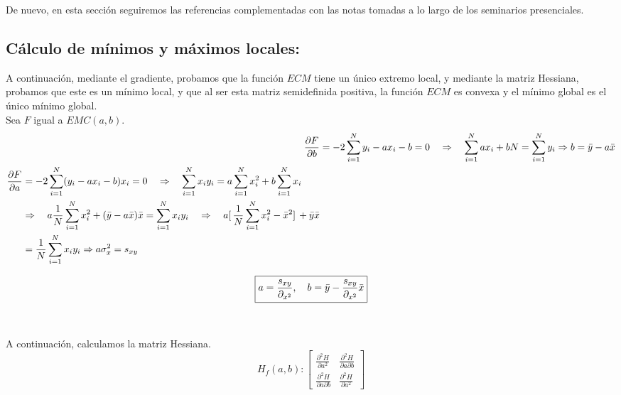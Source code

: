 \documentclass[a4paper,11pt]{article}
\begin{document}
\noindent
De nuevo, en esta sección seguiremos las referencias \cite{cálculo} \cite{cálculo2} complementadas con las notas tomadas a lo largo de los seminarios presenciales.

\subsection{Cálculo de mínimos y máximos locales:}
A continuación, mediante el gradiente, probamos que la función $ECM$ tiene
un único extremo local, y mediante la matriz Hessiana, probamos que este es un
mínimo local, y que al ser esta matriz semidefinida positiva, la función $ECM$ es
convexa y el mínimo global es el único mínimo global. \\Sea $F$ igual a $EMC(a,b)$.
\begin{align}
\frac{\partial{F}}{\partial{b}}&=-2\sum_{i=1}^{N}y_{i}-ax_{i}-b=0\quad \Rightarrow \quad\sum_{i=1}^{N}ax_{i}+bN=\sum_{i=1}^{N}y_{i}\Rightarrow b=\Bar{y}-a\Bar{x}\\
\begin{split}
\frac{\partial{F}}{\partial{a}}&=-2\sum_{i=1}^{N}(y_{i}-ax_{i}-b)x_{i}=0 \quad\Rightarrow \quad \sum_{i=1}^{N}x_{i}y_{i}=a\sum_{i=1}^{N}x_{i}^2+b\sum_{i=1}^{N}x_{i}  \\ & \Rightarrow  \quad a \frac{1}{N}\sum_{i=1}^{N}x_{i}^2+(\Bar{y}-a\Bar{x})\Bar{x}=\sum_{i=1}^{N}x_{i}y_{i} \quad\Rightarrow \quad a[ \,\frac{1}{N} \sum_{i=1}^{N} x_{i}^2-\Bar{x}^2] \,+\Bar{y}\Bar{x} \\&= \frac{1}{N}\sum_{i=1}^{N}x_{i}y_{i}\Rightarrow a\sigma_x^2=s_{xy}
\end{split}
\end{align}

\begin{equation}
\boxed{
a=\frac{s_{xy}}{\partial_{x^2}},\quad b=\Bar{y}-\frac{s_{xy}}{\partial_{x^2}}\Bar{x}
}
\end{equation}
\\
\\A continuación, calculamos la matriz Hessiana.\\

\[
H_f(a,b): 
\begin{bmatrix}
    \frac{\partial^2 H}{\partial a^2} & \frac{\partial^2 H}{\partial a \partial b} \\
    \frac{\partial^2 H}{\partial a \partial b} & \frac{\partial^2 H}{\partial a^2}
\end{bmatrix} \]
\\
\end{document}
